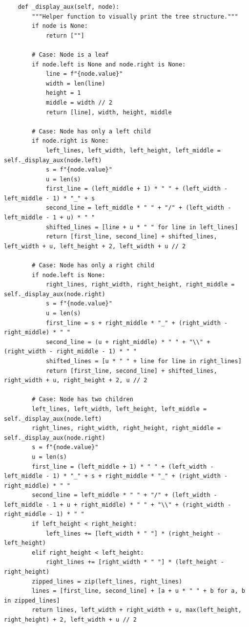 \begin{lstlisting}
    def _display_aux(self, node):
        """Helper function to visually print the tree structure."""
        if node is None:
            return [""]

        # Case: Node is a leaf
        if node.left is None and node.right is None:
            line = f"{node.value}"
            width = len(line)
            height = 1
            middle = width // 2
            return [line], width, height, middle

        # Case: Node has only a left child
        if node.right is None:
            left_lines, left_width, left_height, left_middle = self._display_aux(node.left)
            s = f"{node.value}"
            u = len(s)
            first_line = (left_middle + 1) * " " + (left_width - left_middle - 1) * "_" + s
            second_line = left_middle * " " + "/" + (left_width - left_middle - 1 + u) * " "
            shifted_lines = [line + u * " " for line in left_lines]
            return [first_line, second_line] + shifted_lines, left_width + u, left_height + 2, left_width + u // 2

        # Case: Node has only a right child
        if node.left is None:
            right_lines, right_width, right_height, right_middle = self._display_aux(node.right)
            s = f"{node.value}"
            u = len(s)
            first_line = s + right_middle * "_" + (right_width - right_middle) * " "
            second_line = (u + right_middle) * " " + "\\" + (right_width - right_middle - 1) * " "
            shifted_lines = [u * " " + line for line in right_lines]
            return [first_line, second_line] + shifted_lines, right_width + u, right_height + 2, u // 2

        # Case: Node has two children
        left_lines, left_width, left_height, left_middle = self._display_aux(node.left)
        right_lines, right_width, right_height, right_middle = self._display_aux(node.right)
        s = f"{node.value}"
        u = len(s)
        first_line = (left_middle + 1) * " " + (left_width - left_middle - 1) * "_" + s + right_middle * "_" + (right_width - right_middle) * " "
        second_line = left_middle * " " + "/" + (left_width - left_middle - 1 + u + right_middle) * " " + "\\" + (right_width - right_middle - 1) * " "
        if left_height < right_height:
            left_lines += [left_width * " "] * (right_height - left_height)
        elif right_height < left_height:
            right_lines += [right_width * " "] * (left_height - right_height)
        zipped_lines = zip(left_lines, right_lines)
        lines = [first_line, second_line] + [a + u * " " + b for a, b in zipped_lines]
        return lines, left_width + right_width + u, max(left_height, right_height) + 2, left_width + u // 2
\end{lstlisting}